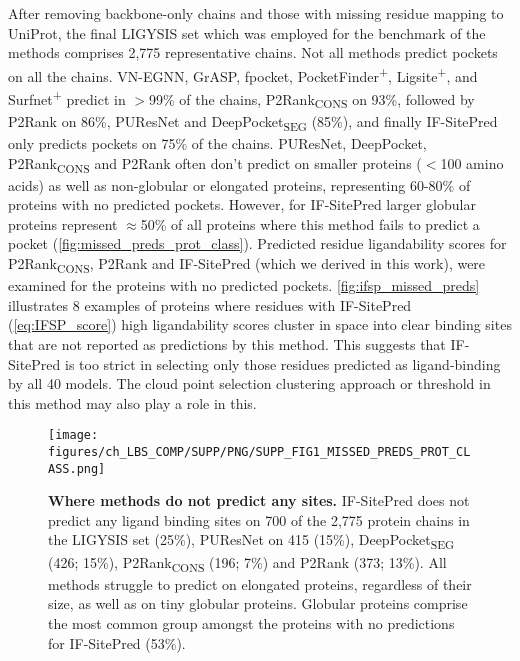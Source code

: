 After removing backbone-only chains and those with missing residue mapping to UniProt, the final LIGYSIS set which was employed for the benchmark of the methods comprises 2,775 representative chains. Not all methods predict pockets on all the chains. VN-EGNN, GrASP, fpocket, PocketFinder\textsuperscript{+}, Ligsite\textsuperscript{+}, and Surfnet\textsuperscript{+} predict in $>$99\% of the chains, P2Rank\textsubscript{CONS} on 93\%, followed by P2Rank on 86\%, PUResNet and DeepPocket\textsubscript{SEG} (85\%), and finally IF-SitePred only predicts pockets on 75\% of the chains. PUResNet, DeepPocket, P2Rank\textsubscript{CONS} and P2Rank often don't predict on smaller proteins ($<$100 amino acids) as well as non-globular or elongated proteins, representing 60-80\% of proteins with no predicted pockets. However, for IF-SitePred larger globular proteins represent $\approx$50\% of all proteins where this method fails to predict a pocket (\autoref{fig:missed_preds_prot_class}). Predicted residue ligandability scores for P2Rank\textsubscript{CONS}, P2Rank and IF-SitePred (which we derived in this work), were examined for the proteins with no predicted pockets. \autoref{fig:ifsp_missed_preds} illustrates 8 examples of proteins where residues with IF-SitePred (\autoref{eq:IFSP_score}) high ligandability scores cluster in space into clear binding sites that are not reported as predictions by this method. This suggests that IF-SitePred is too strict in selecting only those residues predicted as ligand-binding by all 40 models. The cloud point selection clustering approach or threshold in this method may also play a role in this.

\begin{figure}[ht!]
    \centering
    \texttt{[image: figures/ch\_LBS\_COMP/SUPP/PNG/SUPP\_FIG1\_MISSED\_PREDS\_PROT\_CLASS.png]}
    \caption[Where methods do not predict any sites]{\textbf{Where methods do not predict any sites.} IF-SitePred does not predict any ligand binding sites on 700 of the 2,775 protein chains in the LIGYSIS set (25\%), PUResNet on 415 (15\%), DeepPocket\textsubscript{SEG} (426; 15\%), P2Rank\textsubscript{CONS} (196; 7\%) and P2Rank (373; 13\%). All methods struggle to predict on elongated proteins, regardless of their size, as well as on tiny globular proteins. Globular proteins comprise the most common group amongst the proteins with no predictions for IF-SitePred (53\%).}
    \label{fig:missed_preds_prot_class}
\end{figure}

